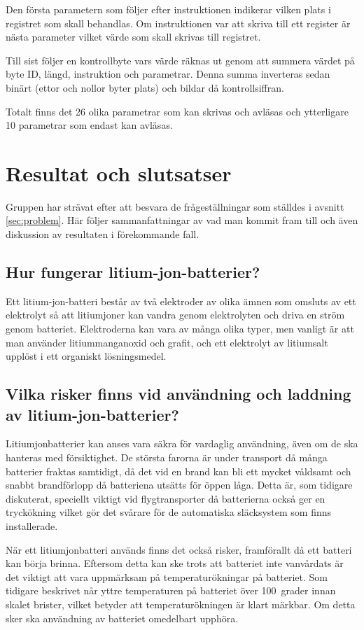 \documentclass[a4paper,12pt]{article}
\begin{document}
Den första parametern som följer efter instruktionen indikerar vilken plats i registret som skall behandlas. Om instruktionen var att skriva till ett register är nästa parameter vilket värde som skall skrivas till registret. 

Till sist följer en kontrollbyte vars värde räknas ut genom att summera värdet på byte ID, längd, instruktion och parametrar. Denna summa inverteras sedan binärt (ettor och nollor byter plats) och bildar då kontrollsiffran.

Totalt finns det 26 olika parametrar som kan skrivas och avläsas och ytterligare 10 parametrar som endast kan avläsas. \cite{dyn-manual}
 
\section{Resultat och slutsatser}
Gruppen har strävat efter att besvara de frågeställningar som ställdes i avsnitt \ref{sec:problem}. Här följer sammanfattningar av vad man kommit fram till och även diskussion av resultaten i förekommande fall.

\subsection{Hur fungerar litium-jon-batterier?}
Ett litium-jon-batteri består av två elektroder av olika ämnen som omsluts av ett elektrolyt så att litiumjoner kan vandra genom elektrolyten och driva en ström genom batteriet. Elektroderna kan vara av många olika typer, men vanligt är att man använder litiummanganoxid och grafit, och ett elektrolyt av litiumsalt upplöst i ett organiskt lösningsmedel.\cite{litium-in-cars}

\subsection{Vilka risker finns vid användning och laddning av litium-jon-batterier?}
Litiumjonbatterier kan anses vara säkra för vardaglig användning, även om de ska hanteras med försiktighet. De största farorna är under transport då många batterier fraktas samtidigt, då det vid en brand kan bli ett mycket våldsamt och snabbt brandförlopp då batteriena utsätts för öppen låga. Detta är, som tidigare diskuterat, speciellt viktigt vid flygtransporter då batterierna också ger en tryckökning vilket gör det svårare för de automatiska släcksystem som finns installerade.

När ett litiumjonbatteri används finns det också risker, framförallt då ett batteri kan börja brinna. Eftersom detta kan ske trots att batteriet inte vanvårdats är det viktigt att vara uppmärksam på temperaturökningar på batteriet. Som tidigare beskrivet når yttre temperaturen på batteriet över 100~grader innan skalet brister, vilket betyder att temperaturökningen är klart märkbar. Om detta sker ska användning av batteriet omedelbart upphöra.
\end{document}
